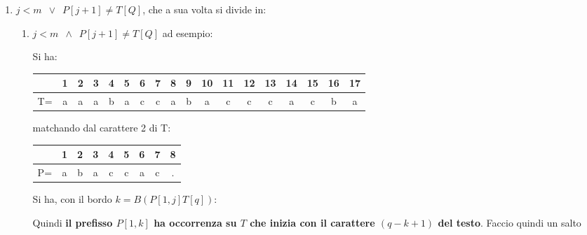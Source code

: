 \begin{enumerate}
  \item $j<m\,\,\,\lor\,\,\,P[j+1]\neq T[Q]$, che a sua volta si divide in:
  \begin{enumerate}
    \item $j<m\,\,\,\land\,\,\,P[j+1]\neq T[Q]$ ad esempio:
    \begin{esempio}
      Si ha:
      \begin{table}[H]
        \centering
        \begin{tabular}{c||c|c|c|c|c|c|c|c|c|c|c|c|c|c|c|c|c}
          \hline
          & 1 & 2 & 3 & 4 & 5 & 6 & 7 & 8 & 9 & 10 & 11 & 12 & 13 &14&15&16&17\\
          \hline
          T=&a& a & a& b& a& c &c &a &b &a&c&c&c&a &c &b &a\\
          \hline
        \end{tabular}
      \end{table}
      matchando dal carattere 2 di T:

      \begin{table}[H]
        \centering
        \begin{tabular}{c||c|c|c|c|c|c|c|c}
          \hline
          & 1 & 2 & 3 & 4 & 5 & 6 & 7 & 8\\
          \hline
          P=&a& b & a& c& c&a&c &. \\
          \hline
        \end{tabular}
      \end{table}
    \end{esempio}
    Si ha, con il bordo $k=B(P[1,j]T[q])$:
    \begin{center}
    \end{center}
    Quindi \textbf{il prefisso $P[1,k]$ ha occorrenza su $T$ che inizia con il
      carattere $(q-k+1)$ del testo}. Faccio quindi un salto


\end{enumerate}
\end{enumerate}
